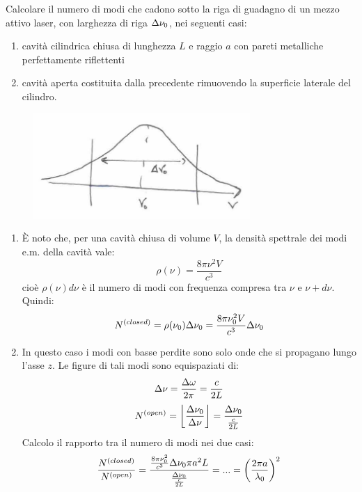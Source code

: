 \begin{example}
Calcolare il numero di modi che cadono sotto la riga di guadagno di un mezzo attivo laser, con larghezza di riga $\Delta\nu_0$, nei seguenti casi:
\begin{enumerate}
\item cavità cilindrica chiusa di lunghezza $L$ e raggio $a$ con pareti metalliche perfettamente riflettenti
\item cavità aperta costituita dalla precedente rimuovendo la superficie laterale del cilindro.
\end{enumerate}
\begin{figure}[H]
\centering
\includegraphics[height=4cm]{images/16.jpg}
\end{figure}
\begin{enumerate}
\item È noto che, per una cavità chiusa di volume $V$, la densità spettrale dei modi e.m. della cavità vale:
\begin{equation*}
\rho(\nu) = \frac{8\pi \nu^2 V}{c^3}
\end{equation*}
cioè $\rho(\nu) d\nu$ è il numero di modi con frequenza compresa tra $\nu$ e $\nu + d\nu$.
Quindi:
\begin{equation*}
N^{(closed)} = \rho(\nu_0) \Delta \nu_0 = \frac{8\pi \nu_0^2 V}{c^3} \Delta\nu_0
\end{equation*}
\item In questo caso i modi con basse perdite sono solo onde che si propagano lungo l'asse $z$. Le figure di tali modi sono equispaziati di:
\begin{equation*}
\Delta\nu = \frac{\Delta\omega}{2\pi} = \frac{c}{2L}
\end{equation*}
\begin{equation*}
N^{(open)} = \left\lfloor \frac{\Delta \nu_0}{\Delta \nu} \right\rfloor = \frac{\Delta \nu_0}{\frac{c}{2L}}
\end{equation*}
Calcolo il rapporto tra il numero di modi nei due casi:
\begin{equation*}
\frac{N^{(closed)}}{N^{(open)}} = \frac{\frac{8\pi \nu_0^2}{c^3} \Delta \nu_0 \pi a^2 L}{\frac{\Delta \nu_0}{\frac{c}{2L}}} = ... = \left( \frac{2\pi a}{\lambda_0} \right)^2
\end{equation*}
\end{enumerate}


\end{example}

